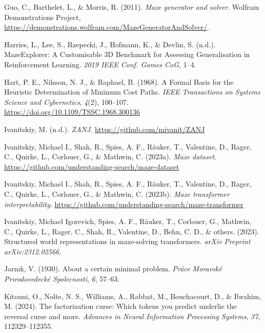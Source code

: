 \documentclass[10pt,a4paper,onecolumn]{article}
\newlength{\cslhangindent}
\newenvironment{CSLReferences}[2] %
 {\begin{list}{}{%
  \setlength{\itemindent}{0pt}
  \setlength{\leftmargin}{0pt}
  \setlength{\parsep}{0pt}
  \ifodd #1
   \setlength{\leftmargin}{\cslhangindent}
   \setlength{\itemindent}{-1\cslhangindent}
  \fi
  \setlength{\itemsep}{#2\baselineskip}}}
 {\end{list}}
\begin{document}
\begin{CSLReferences}{1}{0.5}
\leavevmode{}%
Guo, C., Barthelet, L., \& Morris, R. (2011). \emph{Maze generator and
solver}. Wolfram Demonstrations Project,
\url{https://demonstrations.wolfram.com/MazeGeneratorAndSolver/}.

\leavevmode{}%
Harries, L., Lee, S., Rzepecki, J., Hofmann, K., \& Devlin, S. (n.d.).
{MazeExplorer}: {A Customisable 3D Benchmark} for {Assessing
Generalisation} in {Reinforcement Learning}. \emph{2019 {IEEE Conf}.
{Games CoG}}, 1--4.

\leavevmode{}%
Hart, P. E., Nilsson, N. J., \& Raphael, B. (1968). A {Formal Basis} for
the {Heuristic Determination} of {Minimum Cost Paths}. \emph{IEEE
Transactions on Systems Science and Cybernetics}, \emph{4}(2), 100--107.
\url{https://doi.org/10.1109/TSSC.1968.300136}

\leavevmode{}%
Ivanitskiy, M. (n.d.). \emph{ZANJ}.
\url{https://github.com/mivanit/ZANJ}

\leavevmode{}%
Ivanitskiy, Michael I., Shah, R., Spies, A. F., Räuker, T., Valentine,
D., Rager, C., Quirke, L., Corlouer, G., \& Mathwin, C. (2023a).
\emph{Maze dataset}.
\url{https://github.com/understanding-search/maze-dataset}

\leavevmode{}%
Ivanitskiy, Michael I., Shah, R., Spies, A. F., Räuker, T., Valentine,
D., Rager, C., Quirke, L., Corlouer, G., \& Mathwin, C. (2023b).
\emph{Maze transformer interpretability}.
\url{https://github.com/understanding-search/maze-transformer}

\leavevmode{}%
Ivanitskiy, Michael Igorevich, Spies, A. F., Räuker, T., Corlouer, G.,
Mathwin, C., Quirke, L., Rager, C., Shah, R., Valentine, D., Behn, C.
D., \& others. (2023). Structured world representations in maze-solving
transformers. \emph{arXiv Preprint arXiv:2312.02566}.

\leavevmode{}%
Jarnık, V. (1930). About a certain minimal problem. \emph{Práce Moravské
Prırodovedecké Spolecnosti}, \emph{6}, 57--63.

\leavevmode{}%
Kitouni, O., Nolte, N. S., Williams, A., Rabbat, M., Bouchacourt, D., \&
Ibrahim, M. (2024). The factorization curse: Which tokens you predict
underlie the reversal curse and more. \emph{Advances in Neural
Information Processing Systems}, \emph{37}, 112329--112355.


\end{CSLReferences}
\end{document}
